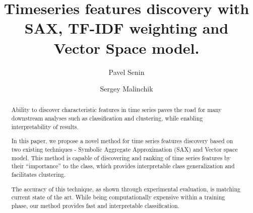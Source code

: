 \documentclass{llncs}
\begin{document}
%
\mainmatter              %
%
\title{Timeseries features discovery with SAX, TF-IDF weighting and Vector Space model.}
%
%
\author{Pavel Senin
\and Sergey Malinchik
}
%
%
%


\maketitle              %

\begin{abstract}
Ability to discover characteristic features in time series 
paves the road for many downstream analyses such as 
classification and clustering, while enabling interpretability of results.

In this paper, we propose a novel method for time series features 
discovery based on two existing techniques - 
Symbolic Aggregate Approximation (SAX) and Vector space model. 
This method is capable of discovering and ranking of time series features by their 
``importance'' to the class, which provides interpretable class generalization
and facilitates clustering.

The accuracy of this technique, as shown through experimental evaluation, 
is matching current state of the art. While being computationally expensive
within a training phase, our method provides fast and interpretable classification.

\end{abstract}
%
\end{document}
